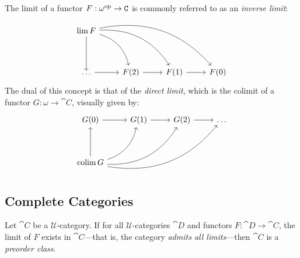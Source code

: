 \begin{example}
    \label{exp:inv-dir-limit}
    The limit of a functor \(F: \omega^{\mathrm{op}} \to \texttt C\) is commonly referred to as
    an \emph{inverse limit}:
    \[
        \begin{tikzcd}
            \Lim F \ar[dd] \ar[drd, bend left] \ar[drdr, bend left] \ar[rdrdr, bend left]
            &&& \\
            &&& \\
            \dots \ar[r] &F(2) \ar[r] &F(1) \ar[r] &F(0)
        \end{tikzcd}
    \]
    The dual of this concept is that of the \emph{direct limit}, which is the
    colimit of a functor \(G: \omega \to \cat C\), visually given by:
    \[
        \begin{tikzcd}
            G(0) \ar[r] &G(1) \ar[r] &G(2) \ar[r] &\dots \\
            &&&\\
            \Colim G
            \ar[uu] \ar[uru, bend right] \ar[urur, bend right] \ar[rurur, bend right]
            &&&
        \end{tikzcd}
    \]
\end{example}

\subsection{Complete Categories}

\begin{proposition}
    \label{prop:all-limits-is-preorder}
    Let \(\cat C\) be a \(\mathcal{U}\)-category. If for all
    \(\mathcal{U}\)-categories \(\cat D\) and functors \(F: \cat D \to \cat C\), the
    limit of \(F\) exists in \(\cat C\)---that is, the category \emph{admits all
        limits}---then \(\cat C\) is a \emph{preorder class}.
\end{proposition}

